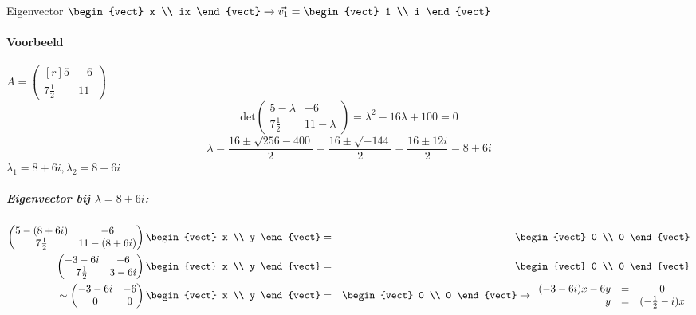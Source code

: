 Eigenvector $\begin{vect} x \\ ix \end{vect} \to \vec{v_1} = \begin{vect} 1 \\ i \end{vect}$

\paragraph{Voorbeeld} $A = \begin{pmatrix*}[r] 5 & -6 \\ 7 \frac{1}{2} & 11 \end{pmatrix*}$
\[ \mbox{det} \begin{pmatrix} 5 - \lambda & -6 \\ 7 \frac{1}{2} & 11 - \lambda \end{pmatrix} = \lambda^2 - 16 \lambda + 100 = 0 \]
\[ \lambda = \frac{16 \pm \sqrt{256-400}}{2} = \frac{16 \pm \sqrt{-144}}{2} = \frac{16 \pm 12i}{2} = 8 \pm 6i \]
$\lambda_1 = 8 + 6i, \lambda_2 = 8 - 6i$

\subparagraph{Eigenvector bij $\lambda = 8+6i$:}
\begin{eqnarray*}
	\begin{pmatrix}
		5 - (8 + 6i) & -6 \\
		7 \frac{1}{2} & 11-(8+6i)
	\end{pmatrix} \begin{vect} x \\ y \end{vect} &=& \begin{vect} 0 \\ 0 \end{vect} \\
	\begin{pmatrix}
		-3 - 6i & -6 \\
		7 \frac{1}{2} & 3 - 6i
	\end{pmatrix} \begin{vect} x \\ y \end{vect} &=& \begin{vect} 0 \\ 0 \end{vect} \\
	\sim \begin{pmatrix}
		-3 - 6i & -6 \\
		0 & 0
	\end{pmatrix} \begin{vect} x \\ y \end{vect} &=& \begin{vect} 0 \\ 0 \end{vect} \to \begin{array}{rlc}
		(-3-6i)x - 6y &=& 0 \\
		y &=& (-\frac{1}{2}-i)x
	\end{array}
\end{eqnarray*}

